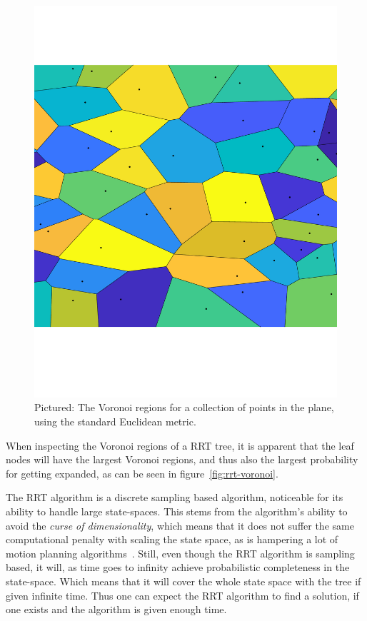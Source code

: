 \begin{figure}
  \centering \includegraphics[scale=.3]{figures/rrt/voronoi-diagram}
  \caption{Pictured: The Voronoi regions for a collection of points in the
    plane, using the standard Euclidean metric.}
  \label{fig:voronoi-diagram}
\end{figure}

When inspecting the Voronoi regions of a \ac{RRT} tree, it is apparent that the
leaf nodes will have the largest Voronoi regions, and thus also the largest
probability for getting expanded, as can be seen in
figure~\cref{fig:rrt-voronoi}.

The \ac{RRT} algorithm is a discrete sampling based algorithm, noticeable for
its ability to handle large state-spaces. This stems from the algorithm's
ability to avoid the \textit{curse of dimensionality}, which means that it does
not suffer the same computational penalty with scaling the state space, as is
hampering a lot of motion planning algorithms~\cite{Lav06}. Still, even though
the \ac{RRT} algorithm is sampling based, it will, as time goes to infinity
achieve probabilistic completeness in the state-space. Which means that it will
cover the whole state space with the tree if given infinite time. Thus one can
expect the \ac{RRT} algorithm to find a solution, if one exists and the
algorithm is given enough time.

